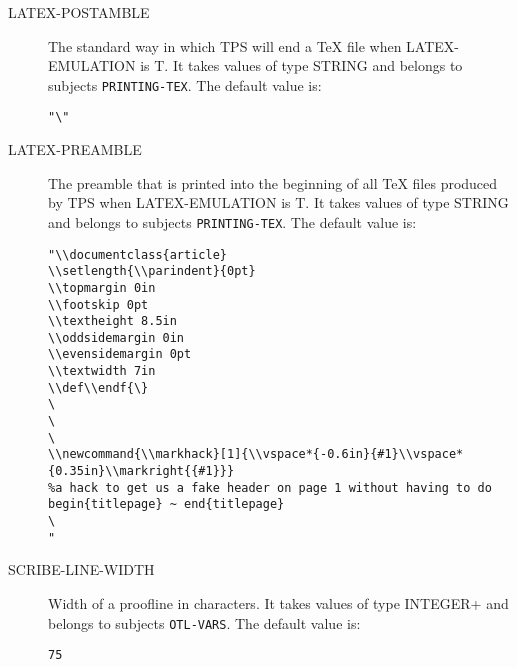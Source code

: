 \begin{description} 
\item[LATEX-POSTAMBLE]  
The standard way in which TPS will end a TeX file
when LATEX-EMULATION is T.
It takes values of type STRING and belongs to subjects \texttt{PRINTING-TEX}.  The default value is: \begin{lstlisting}
"\"
\end{lstlisting}

\item[LATEX-PREAMBLE]  
The preamble that is printed into the beginning of all TeX 
files produced by TPS when LATEX-EMULATION is T.
It takes values of type STRING and belongs to subjects \texttt{PRINTING-TEX}.  The default value is: \begin{lstlisting}
"\\documentclass{article}
\\setlength{\\parindent}{0pt}
\\topmargin 0in
\\footskip 0pt
\\textheight 8.5in
\\oddsidemargin 0in
\\evensidemargin 0pt
\\textwidth 7in 
\\def\\endf{\}
\
\
\
\\newcommand{\\markhack}[1]{\\vspace*{-0.6in}{#1}\\vspace*{0.35in}\\markright{{#1}}}
%a hack to get us a fake header on page 1 without having to do begin{titlepage} ~ end{titlepage}
\
"
\end{lstlisting}

\item[SCRIBE-LINE-WIDTH]  
Width of a proofline in characters.
It takes values of type INTEGER+ and belongs to subjects \texttt{OTL-VARS}.  The default value is: \begin{lstlisting}
75
\end{lstlisting}


\end{description}
